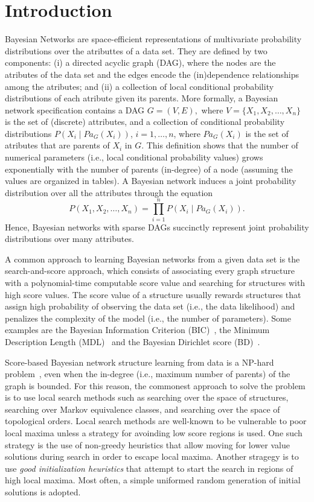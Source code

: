 \section{Introduction}
\label{sec:introduction}

Bayesian Networks are space-efficient representations of multivariate
probability distributions over the atributtes of a data set. They are
defined by two components: (i) a directed acyclic graph (DAG), where the
nodes are the atributes of the data set and the edges encode the
(in)dependence relationships among the atributes; and (ii) a collection
of local conditional probability distributions of each atribute given
its parents. More formally, a Bayesian network specification contains a
DAG \( G = ( V , E ), \)
where $V = \{ X_1 , X_2 , \ldots , X_n \}$ is the set of (discrete)
attributes, and a collection of conditional probability distributions
\( P( X_i \mid {Pa}_G( X_i ) ) \),
$i=1,\ldots,n$, where ${Pa}_G( X_i )$ is the set of atributes that are
parents of $X_i$ in $G$. This definition shows that the number of
numerical parameters (i.e., local conditional probability values) grows
exponentially with the number of parents (in-degree) of a node (assuming
the values are organized in tables). A Bayesian network induces a joint
probability distribution over all the attributes through the equation
\begin{equation}
	\label{eq:jointdist}
	P( X_1 , X_2 , \ldots , X_n ) = \prod_{i=1}^{n} P( X_i \mid {Pa}_G( X_i ) ).
\end{equation}
Hence, Bayesian networks with sparse DAGs succinctly represent joint
probability distributions over many attributes.

A common approach to learning Bayesian networks from a given data set is
the search-and-score approach, which consists of associating every graph
structure with a polynomial-time computable score value and searching
for structures with high score values. The score value of a structure
usually rewards structures that assign high probability of observing the
data set (i.e., the data likelihood) and penalizes the complexity of the
model (i.e., the number of parameters). Some examples are the Bayesian
Information Criterion (BIC)~\cite{BIC91}, the Minimum Description Length
(MDL)~\cite{MDL94} and the Bayesian Dirichlet score (BD)~\cite{BD95}.

Score-based Bayesian network structure learning from data is a NP-hard
problem~\cite{MSResearch04}, even when the in-degree (i.e., maximum
number of parents) of the graph is bounded. For this reason, the
commonest approach to solve the problem is to use local search methods
such as searching over the space of structures, searching over Markov
equivalence classes, and searching over the space of topological
orders. Local search methods are well-known to be vulnerable to poor
local maxima unless a strategy for avoinding low score regions is
used. One such strategy is the use of non-greedy heuristics that allow
moving for lower value solutions during search in order to escape local
maxima. Another stragegy is to use \emph{good initialization heuristics}
that attempt to start the search in regions of high local maxima. Most
often, a simple uniformed random generation of initial solutions is
adopted.

